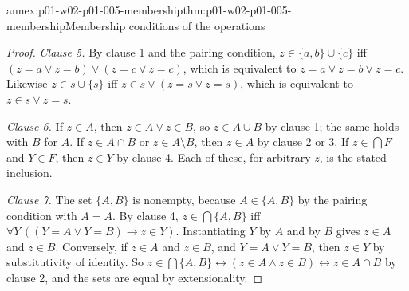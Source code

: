 \begin{annexitem}{annex:p01-w02-p01-005-membership}{thm:p01-w02-p01-005-membership}{Membership conditions of the operations}
\begin{proof}
\emph{Clause 5.} By clause 1 and the pairing condition,
\(z\in\{a,b\}\cup\{c\}\) iff \((z=a\lor z=b)\lor(z=c\lor z=c)\), which is
equivalent to \(z=a\lor z=b\lor z=c\). Likewise
\(z\in s\cup\{s\}\) iff \(z\in s\lor(z=s\lor z=s)\), which is equivalent to
\(z\in s\lor z=s\).

\emph{Clause 6.} If \(z\in A\), then \(z\in A\lor z\in B\), so
\(z\in A\cup B\) by clause 1; the same holds with \(B\) for \(A\). If
\(z\in A\cap B\) or \(z\in A\setminus B\), then \(z\in A\) by clause 2 or 3.
If \(z\in\bigcap F\) and \(Y\in F\), then \(z\in Y\) by clause 4. Each of
these, for arbitrary \(z\), is the stated inclusion.

\emph{Clause 7.} The set \(\{A,B\}\) is nonempty, because \(A\in\{A,B\}\) by
the pairing condition with \(A=A\). By clause 4,
\(z\in\bigcap\{A,B\}\) iff \(\forall Y\,((Y=A\lor Y=B)\to z\in Y)\).
Instantiating \(Y\) by \(A\) and by \(B\) gives \(z\in A\) and \(z\in B\).
Conversely, if \(z\in A\) and \(z\in B\), and \(Y=A\lor Y=B\), then
\(z\in Y\) by substitutivity of identity. So
\(z\in\bigcap\{A,B\}\leftrightarrow(z\in A\land z\in B)
\leftrightarrow z\in A\cap B\) by clause 2, and the sets are equal by
extensionality.
\end{proof}
\end{annexitem}

